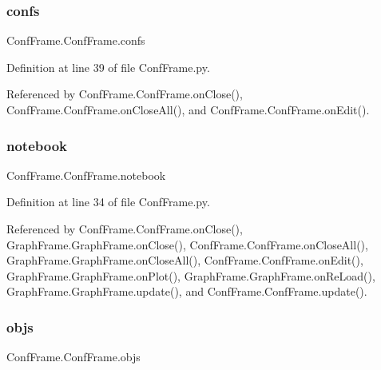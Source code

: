 \mbox{\label{classConfFrame_1_1ConfFrame_a253abaeccaa1d61319f723486bd3ab51}} 
\subsubsection{\texorpdfstring{confs}{confs}}
{\footnotesize\ttfamily Conf\+Frame.\+Conf\+Frame.\+confs}



Definition at line 39 of file Conf\+Frame.\+py.



Referenced by Conf\+Frame.\+Conf\+Frame.\+on\+Close(), Conf\+Frame.\+Conf\+Frame.\+on\+Close\+All(), and Conf\+Frame.\+Conf\+Frame.\+on\+Edit().

\mbox{\label{classConfFrame_1_1ConfFrame_a0e2f293545e00f6762d635713f98942a}} 
\subsubsection{\texorpdfstring{notebook}{notebook}}
{\footnotesize\ttfamily Conf\+Frame.\+Conf\+Frame.\+notebook}



Definition at line 34 of file Conf\+Frame.\+py.



Referenced by Conf\+Frame.\+Conf\+Frame.\+on\+Close(), Graph\+Frame.\+Graph\+Frame.\+on\+Close(), Conf\+Frame.\+Conf\+Frame.\+on\+Close\+All(), Graph\+Frame.\+Graph\+Frame.\+on\+Close\+All(), Conf\+Frame.\+Conf\+Frame.\+on\+Edit(), Graph\+Frame.\+Graph\+Frame.\+on\+Plot(), Graph\+Frame.\+Graph\+Frame.\+on\+Re\+Load(), Graph\+Frame.\+Graph\+Frame.\+update(), and Conf\+Frame.\+Conf\+Frame.\+update().

\mbox{\label{classConfFrame_1_1ConfFrame_a8d6caf98ca21d47a6e1988ed20f5a688}} 
\subsubsection{\texorpdfstring{objs}{objs}}
{\footnotesize\ttfamily Conf\+Frame.\+Conf\+Frame.\+objs}




